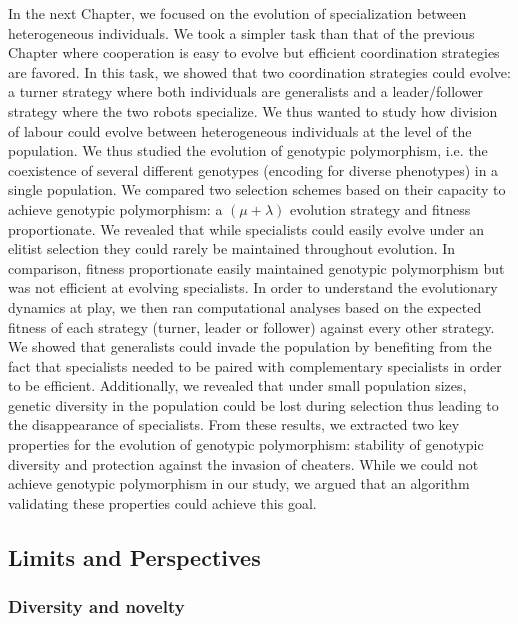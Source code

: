 		In the next Chapter, we focused on the evolution of specialization between heterogeneous individuals. We took a simpler task than that of the previous Chapter where cooperation is easy to evolve but efficient coordination strategies are favored. In this task, we showed that two coordination strategies could evolve: a turner strategy where both individuals are generalists and a leader/follower strategy where the two robots specialize. We thus wanted to study how division of labour could evolve between heterogeneous individuals at the level of the population. We thus studied the evolution of genotypic polymorphism, i.e. the coexistence of several different genotypes (encoding for diverse phenotypes) in a single population. We compared two selection schemes based on their capacity to achieve genotypic polymorphism: a \((\mu + \lambda)\) evolution strategy and fitness proportionate. We revealed that while specialists could easily evolve under an elitist selection they could rarely be maintained throughout evolution. In comparison, fitness proportionate easily maintained genotypic polymorphism but was not efficient at evolving specialists. In order to understand the evolutionary dynamics at play, we then ran computational analyses based on the expected fitness of each strategy (turner, leader or follower) against every other strategy. We showed that generalists could invade the population by benefiting from the fact that specialists needed to be paired with complementary specialists in order to be efficient. Additionally, we revealed that under small population sizes, genetic diversity in the population could be lost during selection thus leading to the disappearance of specialists. From these results, we extracted two key properties for the evolution of genotypic polymorphism: stability of genotypic diversity and protection against the invasion of cheaters. While we could not achieve genotypic polymorphism in our study, we argued that an algorithm validating these properties could achieve this goal.

	\subsection{Limits and Perspectives}

		\subsubsection{Diversity and novelty}

